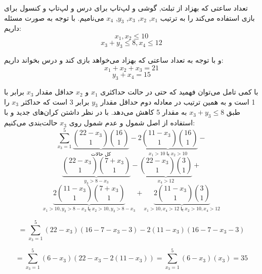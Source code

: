     \p
	تعداد ساعتی که بهزاد از تبلت, گوشی و لپ‌تاپ برای درس و لپ‌تاپ و کنسول برای بازی استفاده می‌کند را به ترتیب $x_1$, $x_2$, $x_3$, $y_3$, $x_4$ می‌نامیم.
    با توجه به صورت مسئله داریم:
    $$x_1, x_2 \leq 10$$
    $$x_3 + y_3 \leq 8 , x_4 \leq 12$$
    
    \p
    و با توجه به تعداد ساعتی که بهزاد می‌خواهد بازی کند و درس بخواند داریم:
    $$x_1 + x_2 + x_3 = 21$$
    $$y_3 + x_4 = 15$$
    
    \p
    با کمی تامل می‌توان فهمید که حتی در حالت حداکثری $x_1$ و $x_2$ حداقل مقدار $x_3$ برابر با 1 است و به همین ترتیب در معادله دوم حداقل مقدار $y_3$ برابر 3 است که حداکثر $x_3$ را طبق $x_3 + y_3 \leq 8$ به مقدار 5 کاهش می‌دهد. با در نظر داشتن کران‌های جدید و با استفاده از اصل شمول و عدم شمول روی $x_3$ حالت‌بندی می‌کنیم:
    $$\sum\limits_{x_3 = 1}^5 \underbrace{{22 - x_3 \choose 1}{16 \choose 1}}_{\text{کل حالات}} - \underbrace{2{11 - x_3 \choose 1}{16 \choose 1}}_{x_1 > 10 \; \text{یا} \; x_2 > 10} - $$
    $$\underbrace{{22 - x_3 \choose 1}{7 + x_3 \choose 1}}_{y_3 > 8 - x_3} - \underbrace{{22 - x_3 \choose 1}{3 \choose 1}}_{x_4 > 12} + $$
    $$\underbrace{2{11 - x_3 \choose 1}{7 + x_3 \choose 1}}_{x_1 > 10, y_3 > 8 - x_3 \; \text{یا} \; x_2 > 10, y_3 > 8 - x_3} + \underbrace{2{11 - x_3 \choose 1}{3 \choose 1}}_{x_1 > 10, x_4 > 12 \; \text{یا} \; x_2 > 10, x_4 > 12}$$
    
    $$= \sum\limits_{x_3 = 1}^5 (22 - x_3)(16 - 7 - x_3 - 3) - 2(11 - x_3)(16 - 7 - x_3 - 3)$$
    
    $$= \sum\limits_{x_3 = 1}^5 (6 - x_3)(22 - x_3 - 2(11 - x_3)) = \sum\limits_{x_3 = 1}^5 (6 - x_3)(x_3) = 35$$
